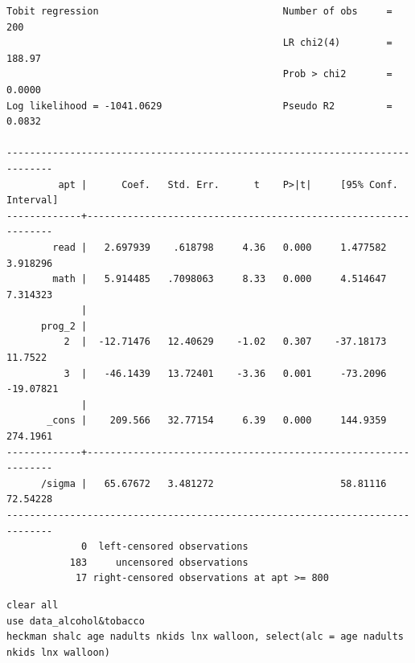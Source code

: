 \documentclass[]{book}
\begin{document}
\begin{verbatim}
Tobit regression                                Number of obs     =        200
                                                LR chi2(4)        =     188.97
                                                Prob > chi2       =     0.0000
Log likelihood = -1041.0629                     Pseudo R2         =     0.0832

------------------------------------------------------------------------------
         apt |      Coef.   Std. Err.      t    P>|t|     [95% Conf. Interval]
-------------+----------------------------------------------------------------
        read |   2.697939    .618798     4.36   0.000     1.477582    3.918296
        math |   5.914485   .7098063     8.33   0.000     4.514647    7.314323
             |
      prog_2 |
          2  |  -12.71476   12.40629    -1.02   0.307    -37.18173     11.7522
          3  |   -46.1439   13.72401    -3.36   0.001     -73.2096   -19.07821
             |
       _cons |    209.566   32.77154     6.39   0.000     144.9359    274.1961
-------------+----------------------------------------------------------------
      /sigma |   65.67672   3.481272                      58.81116    72.54228
------------------------------------------------------------------------------
             0  left-censored observations
           183     uncensored observations
            17 right-censored observations at apt >= 800
\end{verbatim}

\begin{verbatim}
clear all
use data_alcohol&tobacco
heckman shalc age nadults nkids lnx walloon, select(alc = age nadults nkids lnx walloon)
\end{verbatim}
\end{document}
